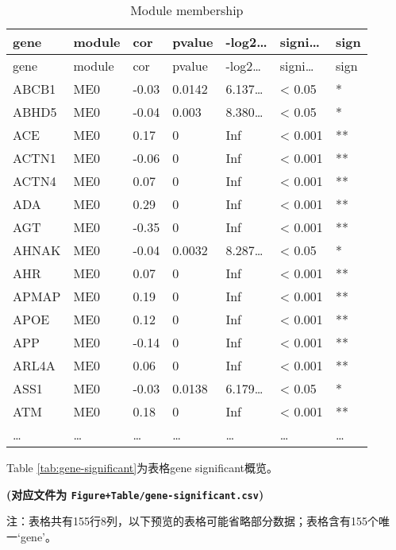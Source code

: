 \documentclass[
]{article}
\begin{document}
\begin{longtable}[]{@{}lllllll@{}}
\caption{\label{tab:module-membership}Module membership}\tabularnewline
\toprule
gene & module & cor & pvalue & -log2\ldots{} & signi\ldots{} & sign\tabularnewline
\midrule
\endfirsthead
\toprule
gene & module & cor & pvalue & -log2\ldots{} & signi\ldots{} & sign\tabularnewline
\midrule
\endhead
ABCB1 & ME0 & -0.03 & 0.0142 & 6.137\ldots{} & \textless{} 0.05 & *\tabularnewline
ABHD5 & ME0 & -0.04 & 0.003 & 8.380\ldots{} & \textless{} 0.05 & *\tabularnewline
ACE & ME0 & 0.17 & 0 & Inf & \textless{} 0.001 & **\tabularnewline
ACTN1 & ME0 & -0.06 & 0 & Inf & \textless{} 0.001 & **\tabularnewline
ACTN4 & ME0 & 0.07 & 0 & Inf & \textless{} 0.001 & **\tabularnewline
ADA & ME0 & 0.29 & 0 & Inf & \textless{} 0.001 & **\tabularnewline
AGT & ME0 & -0.35 & 0 & Inf & \textless{} 0.001 & **\tabularnewline
AHNAK & ME0 & -0.04 & 0.0032 & 8.287\ldots{} & \textless{} 0.05 & *\tabularnewline
AHR & ME0 & 0.07 & 0 & Inf & \textless{} 0.001 & **\tabularnewline
APMAP & ME0 & 0.19 & 0 & Inf & \textless{} 0.001 & **\tabularnewline
APOE & ME0 & 0.12 & 0 & Inf & \textless{} 0.001 & **\tabularnewline
APP & ME0 & -0.14 & 0 & Inf & \textless{} 0.001 & **\tabularnewline
ARL4A & ME0 & 0.06 & 0 & Inf & \textless{} 0.001 & **\tabularnewline
ASS1 & ME0 & -0.03 & 0.0138 & 6.179\ldots{} & \textless{} 0.05 & *\tabularnewline
ATM & ME0 & 0.18 & 0 & Inf & \textless{} 0.001 & **\tabularnewline
\ldots{} & \ldots{} & \ldots{} & \ldots{} & \ldots{} & \ldots{} & \ldots{}\tabularnewline
\bottomrule
\end{longtable}

Table \ref{tab:gene-significant}为表格gene significant概览。

\textbf{(对应文件为 \texttt{Figure+Table/gene-significant.csv})}

\begin{center}\begin{tcolorbox}[colback=gray!10, colframe=gray!50, width=0.9\linewidth, arc=1mm, boxrule=0.5pt]注：表格共有155行8列，以下预览的表格可能省略部分数据；表格含有155个唯一`gene'。
\end{tcolorbox}
\end{center}
\end{document}
